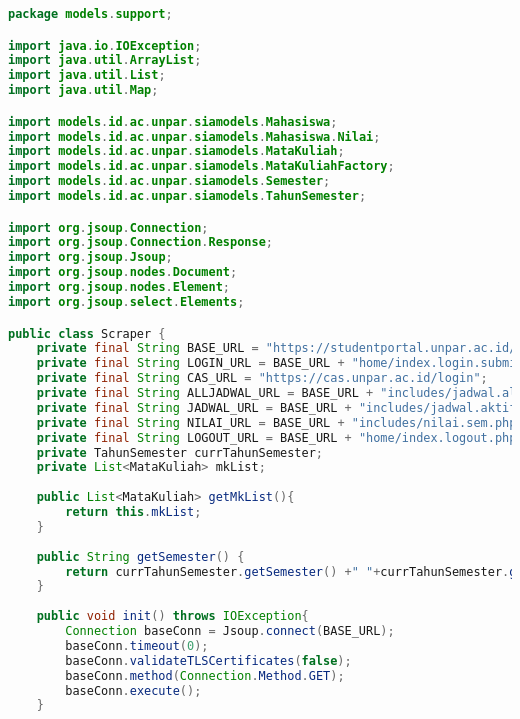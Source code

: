 \singlespacing 
\begin{lstlisting}[language=Java,basicstyle=\tiny,caption=Scraper.java]
package models.support;

import java.io.IOException;
import java.util.ArrayList;
import java.util.List;
import java.util.Map;

import models.id.ac.unpar.siamodels.Mahasiswa;
import models.id.ac.unpar.siamodels.Mahasiswa.Nilai;
import models.id.ac.unpar.siamodels.MataKuliah;
import models.id.ac.unpar.siamodels.MataKuliahFactory;
import models.id.ac.unpar.siamodels.Semester;
import models.id.ac.unpar.siamodels.TahunSemester;

import org.jsoup.Connection;
import org.jsoup.Connection.Response;
import org.jsoup.Jsoup;
import org.jsoup.nodes.Document;
import org.jsoup.nodes.Element;
import org.jsoup.select.Elements;

public class Scraper {
    private final String BASE_URL = "https://studentportal.unpar.ac.id/";
    private final String LOGIN_URL = BASE_URL + "home/index.login.submit.php";
    private final String CAS_URL = "https://cas.unpar.ac.id/login";
    private final String ALLJADWAL_URL = BASE_URL + "includes/jadwal.all.php";
    private final String JADWAL_URL = BASE_URL + "includes/jadwal.aktif.php";
    private final String NILAI_URL = BASE_URL + "includes/nilai.sem.php";
    private final String LOGOUT_URL = BASE_URL + "home/index.logout.php";
    private TahunSemester currTahunSemester;
    private List<MataKuliah> mkList;
    
    public List<MataKuliah> getMkList(){
    	return this.mkList;
    }
    
    public String getSemester() {
        return currTahunSemester.getSemester() +" "+currTahunSemester.getTahun()+"/"+(currTahunSemester.getTahun()+1);
    }
    
    public void init() throws IOException{
        Connection baseConn = Jsoup.connect(BASE_URL);
        baseConn.timeout(0);
        baseConn.validateTLSCertificates(false);
        baseConn.method(Connection.Method.GET);
        baseConn.execute(); 
    }
    

\end{lstlisting}
